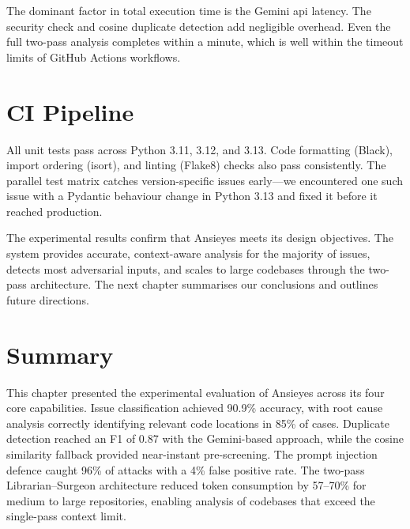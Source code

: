 The dominant factor in total execution time is the Gemini \gls{api} latency. The security check and cosine duplicate detection add negligible overhead. Even the full two-pass analysis completes within a minute, which is well within the timeout limits of GitHub Actions workflows.

\section{CI Pipeline}

All unit tests pass across Python 3.11, 3.12, and 3.13. Code formatting (Black), import ordering (isort), and linting (Flake8) checks also pass consistently. The parallel test matrix catches version-specific issues early---we encountered one such issue with a Pydantic behaviour change in Python 3.13 and fixed it before it reached production.

The experimental results confirm that Ansieyes meets its design objectives. The system provides accurate, context-aware analysis for the majority of issues, detects most adversarial inputs, and scales to large codebases through the two-pass architecture. The next chapter summarises our conclusions and outlines future directions.

\section{Summary}

This chapter presented the experimental evaluation of Ansieyes across its four core capabilities. Issue classification achieved 90.9\% accuracy, with root cause analysis correctly identifying relevant code locations in 85\% of cases. Duplicate detection reached an F1 of 0.87 with the Gemini-based approach, while the cosine similarity fallback provided near-instant pre-screening. The prompt injection defence caught 96\% of attacks with a 4\% false positive rate. The two-pass Librarian--Surgeon architecture reduced token consumption by 57--70\% for medium to large repositories, enabling analysis of codebases that exceed the single-pass context limit.
